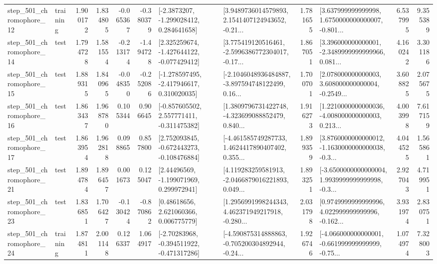 \begin{tabular}{llrrrrllrlrr}
  step\_501\_chromophore\_12 &  training &      1.900172 &    1.834805 &     -0.065367 & -0.380379 &     [-2.3873207, -1.299028412, 0.284641658] &  [3.9489736014579893, 2.1541407124943652, -0.21... &       1.781655 &  [3.637999999999998, 1.6750000000000007, -0.801... &            6.537995 &          9.355389 \\
  step\_501\_chromophore\_14 &      test &      1.794728 &    1.581554 &     -0.213174 & -1.494728 &   [2.325259674, -1.427644122, -0.077429412] &  [3.775419120516461, -2.5996386772304017, -0.17... &       1.867051 &  [3.396000000000001, -2.3489999999999966, 0.081... &            4.160242 &          3.301186 \\
  step\_501\_chromophore\_15 &      test &      1.889315 &    1.840965 &     -0.048350 & -0.252086 &   [-1.278597495, -2.417946617, 0.310020035] &  [-2.1046048936484887, -3.897594748122499, 0.16... &       1.700701 &  [2.078000000000003, 3.608000000000004, -0.2549... &            3.608825 &          2.075675 \\
  step\_501\_chromophore\_16 &      test &      1.863437 &    1.968780 &      0.105344 &  0.906645 &   [-0.857605502, 2.557771411, -0.311475382] &  [1.3809796731422748, -4.323699088852479, 0.840... &       1.916273 &  [1.2210000000000036, -4.008000000000003, 0.213... &            4.003998 &          7.617159 \\
  step\_501\_chromophore\_17 &      test &      1.863954 &    1.962818 &      0.098865 &  0.857800 &   [2.752093845, -0.672443273, -0.108476884] &  [-4.461585749287733, 1.4624417890407402, 0.355... &       1.899359 &  [3.8760000000000012, -1.1630000000000038, -0.3... &            4.044525 &          1.565861 \\
  step\_501\_chromophore\_21 &      test &      1.894784 &    1.896457 &      0.001673 &  0.125047 &     [2.44496569, -1.199071969, 0.299972941] &  [4.119283259581913, -2.0466879016221893, 0.049... &       1.893251 &  [-3.6500000000000004, 1.9939999999999998, -0.3... &            2.927043 &          4.719951 \\
  step\_501\_chromophore\_23 &      test &      1.836851 &    1.706427 &     -0.130424 & -0.870862 &      [0.48618656, 2.621060366, 0.006775779] &  [1.2956991998244343, 4.462371949217918, -0.280... &       2.031798 &  [0.9749999999999996, 4.022999999999996, -0.162... &            3.931974 &          2.830751 \\
  step\_501\_chromophore\_24 &  training &      1.874811 &    2.001148 &      0.126337 &  1.064917 &   [-2.70283968, -0.394511922, -0.471317286] &  [-4.590875314888863, -0.705200304892944, -0.24... &       1.926746 &  [-4.066000000000001, -0.661999999999999, -0.75... &            1.074974 &          7.328003 \\

\end{tabular}
